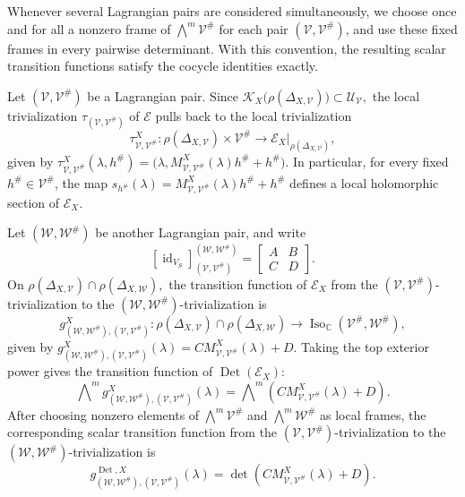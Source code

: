 \documentclass[12pt]{amsart}
\theoremstyle{plain}
\theoremstyle{definition}
\theoremstyle{remark}
\numberwithin{equation}{section} \numberwithin{figure}{section}
\newcommand{\mb}[1]{\mathbb{#1}} %
\newcommand{\mc}[1]{\mathcal{#1}}
\newcommand{\id}{\operatorname{id}}
\begin{document}
Whenever several Lagrangian pairs are considered simultaneously, we
choose once and for all a nonzero frame of
\(\bigwedge^m\mc V^\#\) for each pair
\((\mc V,\mc V^\#)\), and use these fixed frames in every pairwise
determinant. With this convention, the resulting scalar transition
functions satisfy the cocycle identities exactly.

Let \((\mc V,\mc V^\#)\) be a Lagrangian pair. Since
\(
    \mc K_X\bigl(\rho(\Delta_{X,\mc V})\bigr)
    \subset\mc U_{\mc V},
\)
the local trivialization
\(\tau_{(\mc V,\mc V^\#)}\) of \(\mc E\) pulls back to the local
trivialization
\[
    \tau_{\mc V,\mc V^\#}^X:
    \rho(\Delta_{X,\mc V})\times\mc V^\#
    \longrightarrow
    \mc E_X|_{\rho(\Delta_{X,\mc V})},
\]
given by
\(
    \tau_{\mc V,\mc V^\#}^X(\lambda,h^\#)
    =
    \bigl(
        \lambda,
        M_{\mc V,\mc V^\#}^X(\lambda)h^\#+h^\#
    \bigr).
\)
In particular, for every fixed \(h^\#\in\mc V^\#\), the map
\(
    s_{h^\#}(\lambda)
    =
    M_{\mc V,\mc V^\#}^X(\lambda)h^\#+h^\#
\)
defines a local holomorphic section of \(\mc E_X\).

Let \((\mc W,\mc W^\#)\) be another Lagrangian pair, and write
\[
    [\id_{V_S}]_{(\mc V,\mc V^\#)}^{(\mc W,\mc W^\#)}
    =
    \begin{bmatrix}
        A&B\\
        C&D
    \end{bmatrix}.
\]
On
\(
    \rho(\Delta_{X,\mc V})
    \cap
    \rho(\Delta_{X,\mc W}),
\)
the transition function of \(\mc E_X\) from the
\((\mc V,\mc V^\#)\)-trivialization to the
\((\mc W,\mc W^\#)\)-trivialization is
\[
    g_{(\mc W,\mc W^\#),(\mc V,\mc V^\#)}^X:
    \rho(\Delta_{X,\mc V})
    \cap
    \rho(\Delta_{X,\mc W})
    \longrightarrow
    \operatorname{Iso}_{\mb C}(\mc V^\#,\mc W^\#),
\]
given by
\(
    g_{(\mc W,\mc W^\#),(\mc V,\mc V^\#)}^X(\lambda)
    =
    C M_{\mc V,\mc V^\#}^X(\lambda)+D.
\)
Taking the top exterior power gives the transition function of
\(\operatorname{Det}(\mc E_X)\):
\[
    \bigwedge\nolimits^m
    g_{(\mc W,\mc W^\#),(\mc V,\mc V^\#)}^X(\lambda)
    =
    \bigwedge\nolimits^m
    \left(
        C M_{\mc V,\mc V^\#}^X(\lambda)+D
    \right).
\]
After choosing nonzero elements of
\(\bigwedge^m\mc V^\#\) and \(\bigwedge^m\mc W^\#\) as local frames,
the corresponding scalar transition function from the
\((\mc V,\mc V^\#)\)-trivialization to the
\((\mc W,\mc W^\#)\)-trivialization is
\[
    g_{(\mc W,\mc W^\#),(\mc V,\mc V^\#)}
    ^{\operatorname{Det},X}(\lambda)
    =
    \det\!\left(
        C M_{\mc V,\mc V^\#}^X(\lambda)+D
    \right).
\]
\end{document}
